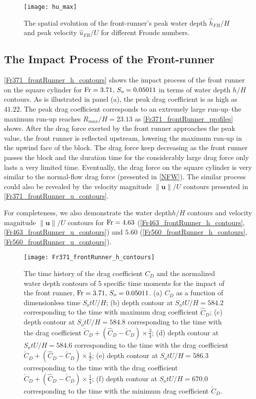 \documentclass{jfm}
\newcommand{\fr}{{\rm{Fr}}}
\begin{document}
\begin{figure}
	\centerline{\texttt{[image: hu\_max]}}
	\caption{The spatial evolution of the front-runner's peak water depth $\hat{h}_{FR}/H$ and peak velocity $\hat{u}_{FR}/U$  for different Froude numbers.}
	\label{hu_max}
\end{figure}

\subsection{The Impact Process of the Front-runner}
\autoref{Fr371_frontRunner_h_contours} shows the impact process of the front runner on the square cylinder for $\fr=3.71,\,S_o= 0.05011$ in terms of water depth $h/H$ contours. As is illustrated in panel (a), the peak drag coefficient is as high as $41.22$. The peak drag coefficient corresponds to an extremely large run-up--the maximum run-up reaches $R_{max}/H=23.13$ as  \autoref{Fr371_frontRunner_profiles} shows. After the drag force exerted by the front runner approaches the peak value, the front runner is reflected upstream, lowering the maximum run-up in the upwind face of the block. The drag force keep decreasing as the front runner passes the block and the duration time for the considerably large drag force only lasts  a very limited time.  Eventually, the drag force on the square cylinder is very  similar to the normal-flow drag force (presented in \autoref{NFW}). The similar process could also be revealed by the velocity magnitude $\left\|{\pmb{u}}\right\|/U$ contours presented in \autoref{Fr371_frontRunner_u_contours}.

For completeness, we also demonstrate the water depth$h/H$  contours and velocity magnitude $\left\|{\pmb{u}}\right\|/U$ contours for $\fr=4.63$ (\autoref{Fr463_frontRunner_h_contours}, \autoref{Fr463_frontRunner_u_contours}) and $5.60$ (\autoref{Fr560_frontRunner_h_contours}, \autoref{Fr560_frontRunner_u_contours}).

\begin{figure}
	\centerline{\texttt{[image: Fr371\_frontRunner\_h\_contours]}}
	\caption{The time history of the drag coefficient $C_D$ and the normalized water depth contours of $5$ specific time moments for the impact of the front runner, $\fr=3.71,\,S_o= 0.05011$. (a) $C_D$ as a function of dimensionless time $S_otU/H$; (b) depth contour at $S_otU/H=584.2$ corresponding to the time with maximum drag coefficient $\hat{C}_{D}$; (c) depth contour at $S_otU/H=584.8$ corresponding to the time with the drag coefficient $\check{C}_{D}+(\hat{C}_{D}-\check{C}_{D})\times\frac{3}{4}$; (d) depth contour at $S_otU/H=584.6$ corresponding to the time with the drag coefficient  $\check{C}_{D}+(\hat{C}_{D}-\check{C}_{D})\times\frac{1}{2}$; (e) depth contour at $S_otU/H=586.3$ corresponding to the time with the drag coefficient  $\check{C}_{D}+(\hat{C}_{D}-\check{C}_{D})\times\frac{1}{4}$; (f) depth contour at $S_otU/H=670.0$ corresponding to the time with the minimum drag coefficient  $\check{C}_{D}$.} 
	\label{Fr371_frontRunner_h_contours}
\end{figure}
\end{document}

